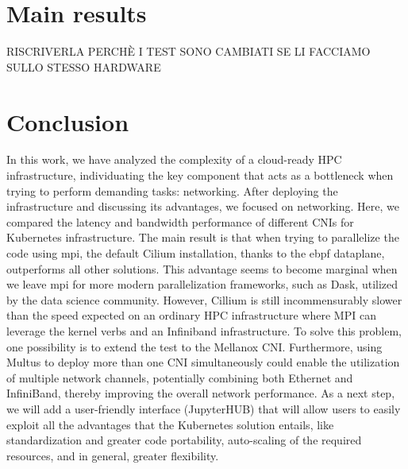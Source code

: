 \section*{Main results}


RISCRIVERLA PERCHÈ  I TEST SONO CAMBIATI SE LI FACCIAMO SULLO STESSO HARDWARE


\section*{Conclusion}

In this work, we have analyzed the complexity of a cloud-ready HPC
infrastructure, individuating the key component that acts as a bottleneck when
trying to perform demanding tasks: networking.
After deploying the infrastructure and discussing its advantages, we focused on
networking. Here, we compared the latency and bandwidth performance of different
CNIs for Kubernetes infrastructure.
The main result is that when trying to parallelize the code using mpi, the
default Cilium installation, thanks to the ebpf dataplane, outperforms all other
solutions.
This advantage seems to become marginal when we leave mpi for more modern
parallelization frameworks, such as Dask, utilized by the data science
community.
However, Cillium is still incommensurably slower than the speed expected on an
ordinary HPC infrastructure where MPI can leverage the kernel verbs and an
Infiniband infrastructure.
To solve this problem, one possibility is to extend the test to the Mellanox CNI.
Furthermore, using Multus to deploy more than one CNI simultaneously could
enable the utilization of multiple network channels, potentially combining both
Ethernet and InfiniBand, thereby improving the overall network performance.
As a next step, we will add a user-friendly interface (JupyterHUB) that will
allow users to easily exploit all the advantages that the Kubernetes solution
entails, like standardization and greater code portability, auto-scaling of the
required resources, and in general, greater flexibility.
